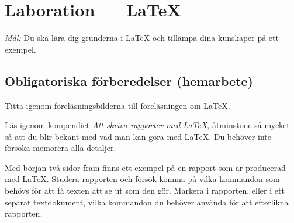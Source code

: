 \section{Laboration  --- \LaTeX}

\emph{Mål:} Du ska lära dig grunderna i {\LaTeX} och tillämpa dina kunskaper på ett exempel.


\subsection*{Obligatoriska förberedelser (hemarbete)}
\begin{Hemarbete}\firmlist
	\item Titta igenom föreläsningsbilderna till föreläsningen om \LaTeX.
	\item Läs igenom kompendiet \emph{Att skriva rapporter med \LaTeX}, åtminstone så mycket så att du blir bekant med vad man kan göra med \LaTeX. Du behöver inte försöka memorera alla detaljer.
	\item \label{hem:latexuppg} Med början två sidor fram finns ett exempel på en rapport som är producerad med \LaTeX. Studera rapporten och försök komma på vilka kommandon som behövs för att få texten att se ut som den gör. Markera i rapporten, eller i ett separat textdokument, vilka kommandon du behöver använda för att efterlikna rapporten.
\end{Hemarbete}

